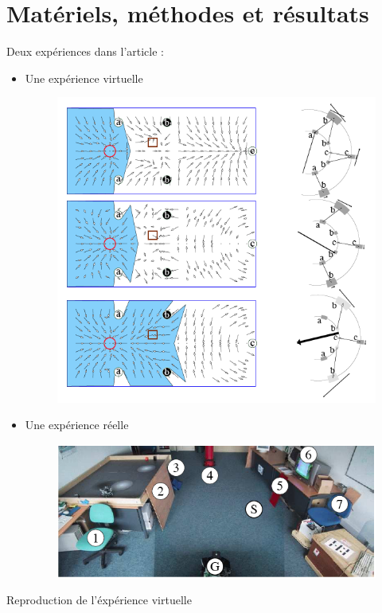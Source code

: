 \documentclass{beamer}
\begin{document}
\section{Matériels, méthodes et résultats}


\begin{frame}
  Deux expériences dans l'article :
  \begin{itemize}
    \item Une expérience virtuelle
    \begin{figure}
      \centering
      \includegraphics[scale=0.2]{Exp-virtuel.png}
    \end{figure}
    \item Une expérience réelle
    \begin{figure}
      \centering
      \includegraphics[scale=0.2]{Exp-real.png}
    \end{figure}
  \end{itemize}
  Reproduction de l'éxpérience virtuelle

\end{frame}
\end{document}

